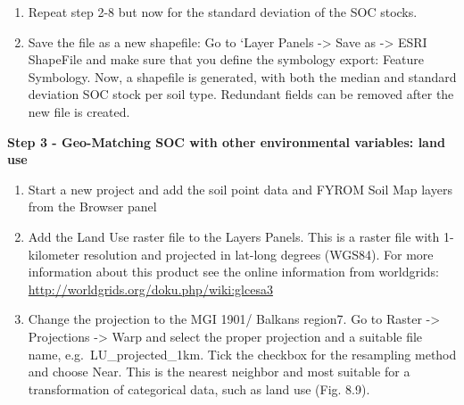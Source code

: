 \documentclass[10pt,b5paper,]{book}
\providecommand{\tightlist}{%
  \setlength{\itemsep}{0pt}\setlength{\parskip}{0pt}}
\theoremstyle{definition}
\theoremstyle{definition}
\theoremstyle{definition}
\theoremstyle{remark}
\begin{document}
\begin{enumerate}
\def\labelenumi{\arabic{enumi}.}
\setcounter{enumi}{9}
\tightlist
\item
  Repeat step 2-8 but now for the standard deviation of the SOC stocks.
\item
  Save the file as a new shapefile: Go to `Layer Panels -\textgreater{}
  Save as -\textgreater{} ESRI ShapeFile and make sure that you define
  the symbology export: Feature Symbology. Now, a shapefile is
  generated, with both the median and standard deviation SOC stock per
  soil type. Redundant fields can be removed after the new file is
  created.
\end{enumerate}

\textbf{Step 3 - Geo-Matching SOC with other environmental variables:
land use}

\begin{enumerate}
\def\labelenumi{\arabic{enumi}.}
\tightlist
\item
  Start a new project and add the soil point data and FYROM Soil Map
  layers from the Browser panel
\item
  Add the Land Use raster file to the Layers Panels. This is a raster
  file with 1-kilometer resolution and projected in lat-long degrees
  (WGS84). For more information about this product see the online
  information from worldgrids:
  \url{http://worldgrids.org/doku.php/wiki:glcesa3}
\item
  Change the projection to the MGI 1901/ Balkans region7. Go to Raster
  -\textgreater{} Projections -\textgreater{} Warp and select the proper
  projection and a suitable file name, e.g.~LU\_projected\_1km. Tick the
  checkbox for the resampling method and choose Near. This is the
  nearest neighbor and most suitable for a transformation of categorical
  data, such as land use (Fig. 8.9).
\end{enumerate}
\end{document}
